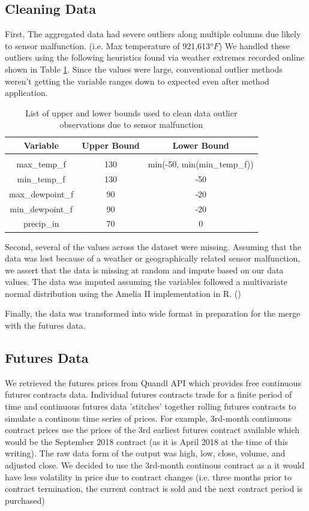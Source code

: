 \documentclass[twoside,11pt]{article}
\begin{document}
	\subsection{Cleaning Data}
	First, The aggregated data had severe outliers along multiple columns due likely to sensor malfunction. (i.e. Max temperature of 921,613$^oF$) We handled these outliers using the following heuristics found via weather extremes recorded online shown in Table \ref{tab:bounds}. Since the values were large, conventional outlier methods weren't getting the variable ranges down to expected even after method application.  

	\begin{table}[htbp]
		\centering
		\begin{tabular}{ccc}
			Variable & Upper Bound & Lower Bound \\
			\hline \\[-11pt]
			max\_temp\_f & 130 & min(-50, min(min\_temp\_f))\\
			min\_temp\_f & 130 & -50 \\
			max\_dewpoint\_f & 90 & -20\\
			min\_dewpoint\_f & 90 & -20\\
			precip\_in & 70 & 0\\
			\hline
		\end{tabular}
		\caption{List of upper and lower bounds used to clean data outlier observations due to sensor malfunction}\label{tab:bounds}
	\end{table}

	Second, several of the values across the dataset were missing. Assuming that the data was lost because of a weather or geographically related sensor malfunction, we assert that the data is missing at random and impute based on our data values. The data was imputed assuming the variables followed a multivariate normal distribution using the Amelia II implementation in R. (\cite{ameila})
	
	Finally, the data was transformed into wide format in preparation for the merge with the futures data. 

\subsection{Futures Data}
 
We retrieved the futures prices from Quandl API which provides free continuous futures contracts data. Individual futures contracts trade for a finite period of time and continuous futures data 'stitches' together rolling futures contracts to simulate a continous time series of prices.  For example, 3rd-month continuous contract prices use the prices of the 3rd earliest futures contract available which would be the September 2018 contract (as it is April 2018 at the time of this writing).  The raw data form of the output was high, low, close, volume, and adjusted close. We decided to use the 3rd-month continous contract as a it would have less volatility in price due to contract changes (i.e. three months prior to contract termination, the current contract is sold and the next contract period is purchased)
\end{document}

